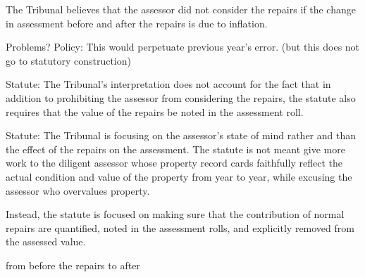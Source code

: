 The Tribunal believes that the assessor did not consider the repairs if the change in assessment before and after the repairs is due to inflation.

Problems?
Policy: This would perpetuate previous year's error. (but this does not go to statutory construction)

Statute: The Tribunal's interpretation does not account for the fact that in addition to prohibiting the assessor from considering the repairs, the statute also requires that the value of the repairs be noted in the assessment roll.

Statute: The Tribunal is focusing on the assessor's state of mind rather and than the effect of the repairs on the assessment. The statute is not meant give more work to the diligent assessor whose property record cards  faithfully reflect the actual condition and value of the property from year to year, while excusing the assessor who overvalues property.

Instead, the statute is focused on making sure that the contribution of normal repairs are quantified, noted in the assessment rolls, and explicitly removed from the assessed value. 

from before the repairs to after 













